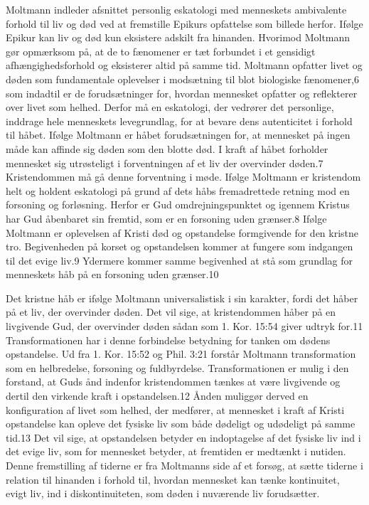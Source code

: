 Moltmann indleder afsnittet personlig eskatologi med menneskets ambivalente forhold til liv og død ved at fremstille Epikurs opfattelse som billede herfor. Ifølge Epikur kan liv og død kun eksistere adskilt fra hinanden. Hvorimod Moltmann gør opmærksom på, at de to fænomener er tæt forbundet i et gensidigt afhængighedsforhold og eksisterer altid på samme tid. Moltmann opfatter livet og døden som fundamentale oplevelser i modsætning til blot biologiske fænomener,6 som indadtil er de forudsætninger for, hvordan mennesket opfatter og reflekterer over livet som helhed. Derfor må en eskatologi, der vedrører det personlige, inddrage hele menneskets levegrundlag, for at bevare dens autenticitet i forhold til håbet. Ifølge Moltmann er håbet forudsætningen for, at mennesket på ingen måde kan affinde sig døden som den blotte død. I kraft af håbet forholder mennesket sig utrøsteligt i forventningen af et liv der overvinder døden.7 Kristendommen må gå denne forventning i møde. Ifølge Moltmann er kristendom helt og holdent eskatologi på grund af dets håbs fremadrettede retning mod en forsoning og forløsning. Herfor er Gud omdrejningspunktet og igennem Kristus har Gud åbenbaret sin fremtid, som er en forsoning uden grænser.8 Ifølge Moltmann er oplevelsen af Kristi død og opstandelse formgivende for den kristne tro. Begivenheden på korset og opstandelsen kommer at fungere som indgangen til det evige liv.9 Ydermere kommer samme begivenhed at stå som grundlag for menneskets håb på en forsoning uden grænser.10

Det kristne håb er ifølge Moltmann universalistisk i sin karakter, fordi det håber på et liv, der overvinder døden. Det vil sige, at kristendommen håber på en livgivende Gud, der overvinder døden sådan som 1. Kor. 15:54 giver udtryk for.11  Transformationen har i denne forbindelse betydning for tanken om dødens opstandelse. Ud fra 1. Kor. 15:52 og Phil. 3:21 forstår Moltmann transformation som en helbredelse, forsoning og fuldbyrdelse. Transformationen er mulig i den forstand, at Guds ånd indenfor kristendommen tænkes at være livgivende og dertil den virkende kraft i opstandelsen.12 Ånden muliggør derved en konfiguration af livet som helhed, der medfører, at mennesket i kraft af Kristi opstandelse kan opleve det fysiske liv som både dødeligt og udødeligt på samme tid.13 Det vil sige, at opstandelsen betyder en indoptagelse af det fysiske liv ind i det evige liv, som for mennesket betyder, at fremtiden er medtænkt i nutiden. Denne fremstilling af tiderne er fra Moltmanns side af et forsøg, at sætte tiderne i relation til hinanden i forhold til, hvordan mennesket kan tænke kontinuitet, evigt liv, ind i diskontinuiteten, som døden i nuværende liv forudsætter.

